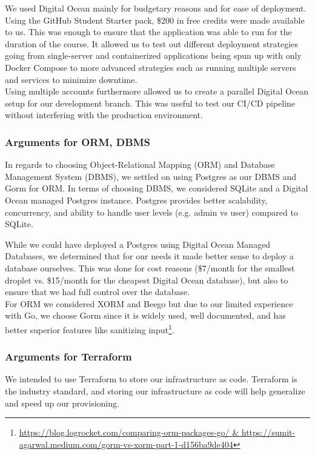 We used Digital Ocean mainly for budgetary reasons and for ease of deployment. Using the GitHub Student Starter pack, \$200 in free credits were made available to us. This was enough to ensure that the application 
was able to run for the duration of the course. It allowed us to test out different deployment strategies going from single-server and containerized applications being spun up with only Docker Compose to more advanced strategies such as running multiple servers and services to minimize downtime.\\

Using multiple accounts furthermore allowed us to create a parallel Digital Ocean setup for our development branch.
This was useful to test our CI/CD pipeline without interfering with the production environment.

\subsubsection{Arguments for ORM, DBMS}
In regards to choosing Object-Relational Mapping (ORM) and Database Management System (DBMS), we settled on using Postgres as our DBMS and Gorm for ORM. In terms of choosing DBMS, we considered SQLite and a Digital Ocean managed Postgres instance. Postgres provides better scalability, concurrency, and ability
to handle user levels (e.g. admin vs user) compared to SQLite.

While we could have deployed a Postgres using Digital Ocean Managed Databases, we determined that for our needs it made 
better sense to deploy a database ourselves. This was done for cost reasons (\$7/month for the smallest droplet vs. \$15/month 
for the cheapest Digital Ocean database), but also to ensure that we had full control over the database.\\

For ORM we considered XORM and Beego but due to our limited experience with Go, we choose Gorm 
since it is widely used, well documented, and has better superior features like sanitizing input\footnote{\url{https://blog.logrocket.com/comparing-orm-packages-go/ & https://sumit-agarwal.medium.com/gorm-vs-xorm-part-1-d156ba9de404}}.

\subsubsection{Arguments for Terraform}
We intended to use Terraform to store our infrastructure as code. Terraform is the industry standard, and storing our infrastructure as code will help generalize and speed up our provisioning. 

